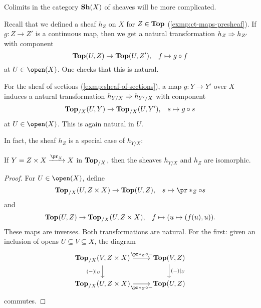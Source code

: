 \begin{rmk}
Colimits in the category $\operatorname{\mathbf{Sh}}(X)$ of sheaves will be more complicated.
\end{rmk}

\begin{exmp}
Recall that we defined a sheaf $h_Z$ on $X$ for $Z\in\mathbf{Top}$ (\cref{exmp:ct-maps-presheaf}).
If $g\colon Z\to Z'$ is a continuous map, then we get a natural transformation $h_Z\Rightarrow h_{Z'}$ with component
\[ \cont(U,Z) \to \cont(U,Z')\text{,} \quad f \mapsto g\circ f \]
at $U\in\open(X)$.
One checks that this is natural.
\end{exmp}

\begin{exmp}
For the sheaf of sections (\cref{exmp:sheaf-of-sections}), a map $g\colon Y\to Y'$ over $X$ induces a natural transformation $h_{Y/X}\Rightarrow h_{Y'/X}$ with component
\[ \cont[X](U,Y) \to \cont[X](U,Y')\text{,} \quad s \mapsto g\circ s \]
at $U\in\open(X)$.
This is again natural in $U$.
\end{exmp}

In fact, the sheaf $h_Z$ is a special case of $h_{Y/X}$:
\begin{lem}
If $Y=Z\times X\xrightarrow{\pr_X} X$ in $\mathbf{Top}_{/X}$, then the sheaves $h_{Y/X}$ and $h_Z$ are isomorphic.
\end{lem}
\begin{proof}
For $U\in\open(X)$, define
\[ \cont[X](U,Z\times X) \to \cont(U,Z)\text{,} \quad s\mapsto \pr*_Z\circ s \]
and
\[ \cont(U,Z) \to \cont[X](U,Z\times X)\text{,} \quad f \mapsto (u\mapsto (f(u),u))\text{.} \]
These maps are inverses.
Both transformations are natural. For the first: given an inclusion of opens $U\subseteq V\subseteq X$, the diagram
\begin{equation*}
    \begin{tikzcd}
        \cont[X](V,Z\times X) \ar[r, "\pr*_Z\circ -"] \ar[d, "(-)|_U"'] & \cont(V,Z) \ar[d, "(-)|_U"] \\
        \cont[X](U,Z\times X) \ar[r, "\pr*_Z\circ -"'] & \cont(U,Z)
    \end{tikzcd}
\end{equation*}
commutes.
\end{proof}


